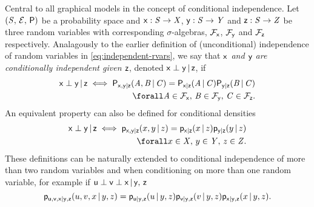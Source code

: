 Central to all graphical models in the concept of conditional independence. Let $(\mathit{S},\,\mathcal{E},\,\mathsf{P})$ be a probability space and $\mathsf{x} : \mathit{S} \to \mathit{X}$, $\mathsf{y} : \mathit{S} \to \mathit{Y}$ and $\mathsf{z} : \mathit{S} \to \mathit{Z}$ be three random variables with corresponding $\sigma$-algebras, $\mathcal{F}_{\mathsf{x}}$, $\mathcal{F}_{\mathsf{y}}$ and $\mathcal{F}_{\mathsf{z}}$ respectively. Analagously to the earlier definition of (unconditional) independence of random variables in \eqref{eq:independent-rvars}, we say that \emph{$\mathsf{x}$ and $\mathsf{y}$ are conditionally independent given $\mathsf{z}$}, denoted $\mathsf{x} \perp \mathsf{y} \operatorname{|} \mathsf{z}$, if
\begin{equation}\label{eq:conditional-independence-property}
\begin{split}
  \rvar{x} \perp \rvar{y} \gvn \rvar{z} \iff
  \prob{\rvar{x},\rvar{y}|\rvar{z}}(\set{A},\set{B}\gvn\set{C}) =
  \prob{\rvar{x}|\rvar{z}}(\set{A}\gvn\set{C})
  \prob{\rvar{y}|\rvar{z}}(\set{B}\gvn\set{C})
  \\ \forall 
  \set{A} \in \sset{F}_{\rvar{x}},\,
  \set{B} \in \sset{F}_{\rvar{y}},\,
  \set{C} \in \sset{F}_{\rvar{z}}.
\end{split}	
\end{equation}
An equivalent property can also be defined for conditional densities
\begin{equation}\label{eq:conditional-independence-densities}
\begin{split}
  \rvar{x} \perp \rvar{y} \gvn \rvar{z} \iff
  \pden{\rvar{x},\rvar{y}|\rvar{z}}(x,y \gvn z) =
  \pden{\rvar{x}|\rvar{z}}(x \gvn z)
  \pden{\rvar{y}|\rvar{z}}(y \gvn z)
  \\ \forall 
  x \in \set{X},\,
  y \in \set{Y},\,
  z \in \set{Z}.
\end{split}	
\end{equation}
These definitions can be naturally extended to conditional independence of more than two random variables and when conditioning on more than one random variable, for example if $\mathsf{u} \perp \mathsf{v} \perp \mathsf{x} \operatorname{|} \mathsf{y},\,\mathsf{z}$
\begin{equation}\label{eq:conditional-independence-many-vars}
  \mathsf{p}_{\mathsf{u},\mathsf{v},\mathsf{x}|\mathsf{y},\mathsf{z}}(u,v,x \operatorname{|} y,z) =
  \mathsf{p}_{\mathsf{u}|\mathsf{y},\mathsf{z}}(u \operatorname{|} y,z)
  \mathsf{p}_{\mathsf{v}|\mathsf{y},\mathsf{z}}(v \operatorname{|} y,z)
  \mathsf{p}_{\mathsf{x}|\mathsf{y},\mathsf{z}}(x \operatorname{|} y,z).
\end{equation}

